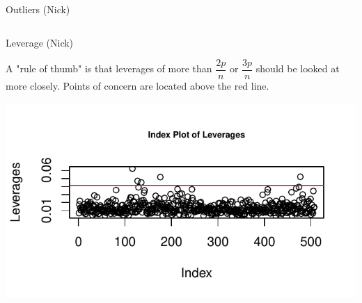 \documentclass[table]{beamer}\usepackage[]{graphicx}\usepackage[]{color}
\makeatletter
\def\maxwidth{ %
  \ifdim\Gin@nat@width>\linewidth
    \linewidth
  \else
    \Gin@nat@width
  \fi
}
\newenvironment{knitrout}{}{} %
\makeatother
\begin{document}
\begin{frame}{Outliers (Nick)}
\begin{columns}[t]
\begin{column}[c]{4.5cm}
\begin{knitrout}
\end{knitrout}


  \end{column}
  \end{columns}

\end{frame}

\begin{frame} {Leverage (Nick)} %

A "rule of thumb" is that leverages of more than $\dfrac{2p}{n}$ or $\dfrac{3p}{n}$ should be looked at more closely.  Points of concern are located above the red line. 

\begin{knitrout}
\color{fgcolor}
\includegraphics[width=\maxwidth]{figure/leverage} 

\end{knitrout}



\end{frame}

\end{document}
